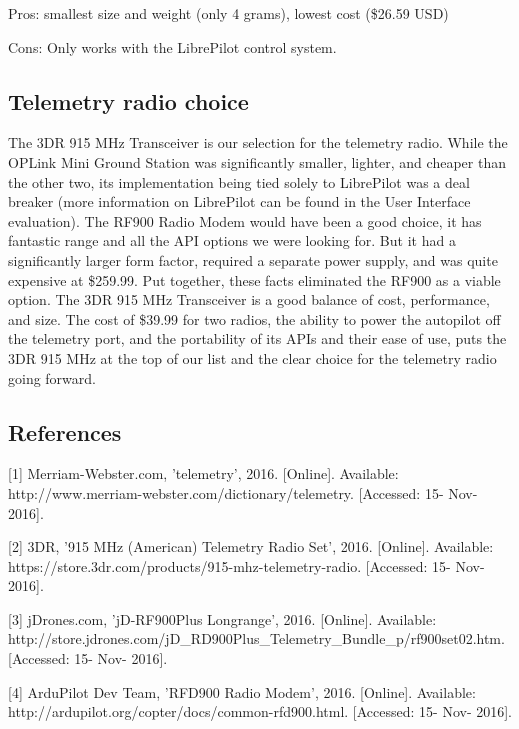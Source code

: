\documentclass[compsoc,draftclsnofoot,onecolumn,10pt]{IEEEtran}
\begin{document}
Pros: smallest size and weight (only 4 grams), lowest cost (\$26.59 USD)

Cons: Only works with the LibrePilot control system.


\subsection{Telemetry radio choice}
The 3DR 915 MHz Transceiver is our selection for the telemetry radio.
While the OPLink Mini Ground Station was significantly smaller, lighter, and
cheaper than the other two, its implementation being tied solely to LibrePilot
was a deal breaker (more information on LibrePilot can be found in the User
Interface evaluation).
The RF900 Radio Modem would have been a good choice, it has fantastic range
and all the API options we were looking for. But it had a significantly larger
form factor, required a separate power supply, and was quite expensive at
\$259.99. Put together, these facts eliminated the RF900 as a viable option.
The 3DR 915 MHz Transceiver is a good balance of cost, performance, and size. The
cost of \$39.99 for two radios, the ability to power the autopilot off the
telemetry port, and the portability of its APIs and their ease of use, puts the
3DR 915 MHz at the top of our list and the clear choice for the telemetry
radio going forward.

\subsection{References}

[1] Merriam-Webster.com, 'telemetry', 2016. [Online]. Available: http://www.merriam-webster.com/dictionary/telemetry. [Accessed: 15- Nov- 2016].\par

[2] 3DR, '915 MHz (American) Telemetry Radio Set', 2016. [Online]. Available: https://store.3dr.com/products/915-mhz-telemetry-radio. [Accessed: 15- Nov- 2016].\par

[3] jDrones.com, 'jD-RF900Plus Longrange', 2016. [Online]. Available: http://store.jdrones.com/jD\_RD900Plus\_Telemetry\_Bundle\_p/rf900set02.htm. [Accessed: 15- Nov- 2016].\par

[4] ArduPilot Dev Team, 'RFD900 Radio Modem', 2016. [Online]. Available: http://ardupilot.org/copter/docs/common-rfd900.html. [Accessed: 15- Nov- 2016].\par
\end{document}
